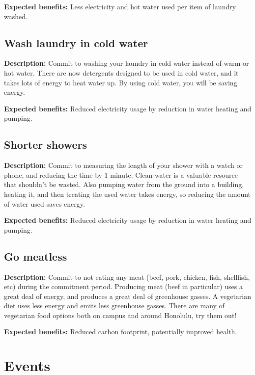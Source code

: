 \vspace{2ex}
\textbf{Expected benefits:} Less electricity and hot water used per item of laundry washed.


\subsection{Wash laundry in cold water}

\textbf{Description:} Commit to washing your laundry in cold water instead of warm or hot water. There are now detergents designed to be used in cold water, and it takes lots of energy to heat water up. By using cold water, you will be saving energy.

\vspace{2ex}
\textbf{Expected benefits:} Reduced electricity usage by reduction in water heating and pumping.


\subsection{Shorter showers}

\textbf{Description:} Commit to measuring the length of your shower with a watch or phone, and reducing the time by 1 minute. Clean water is a valuable resource that shouldn't be wasted. Also pumping water from the ground into a building, heating it, and then treating the used water takes energy, so reducing the amount of water used saves energy.

\vspace{2ex}
\textbf{Expected benefits:} Reduced electricity usage by reduction in water heating and pumping.


\subsection{Go meatless}

\textbf{Description:} Commit to not eating any meat (beef, pork, chicken, fish, shellfish, etc) during the commitment period. Producing meat (beef in particular) uses a great deal of energy, and produces a great deal of greenhouse gasses. A vegetarian diet uses less energy and emits less greenhouse gasses. There are many of vegetarian food options both on campus and around Honolulu, try them out!

\vspace{2ex}
\textbf{Expected benefits:} Reduced carbon footprint, potentially improved health.


\section{Events}


